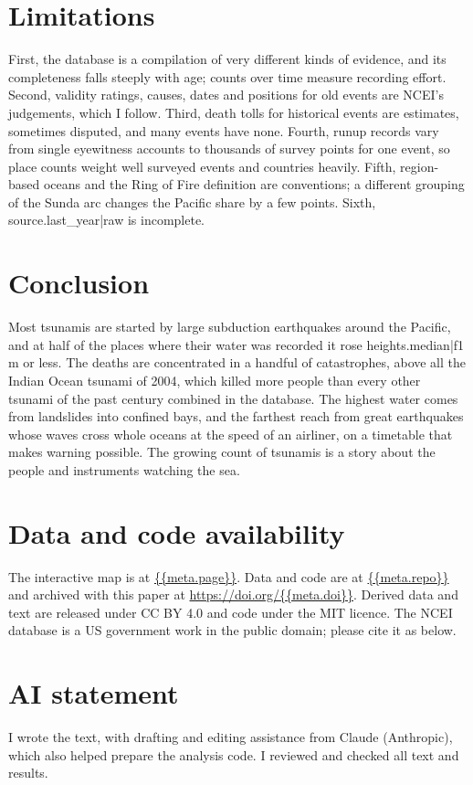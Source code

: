 \documentclass[11pt,a4paper]{article}
\begin{document}
\section{Limitations}
First, the database is a compilation of very different kinds of evidence, and its completeness falls steeply with age; counts over time measure recording effort. Second, validity ratings, causes, dates and positions for old events are NCEI's judgements, which I follow. Third, death tolls for historical events are estimates, sometimes disputed, and many events have none. Fourth, runup records vary from single eyewitness accounts to thousands of survey points for one event, so place counts weight well surveyed events and countries heavily. Fifth, region-based oceans and the Ring of Fire definition are conventions; a different grouping of the Sunda arc changes the Pacific share by a few points. Sixth, {{source.last_year|raw}} is incomplete.

\section{Conclusion}
Most tsunamis are started by large subduction earthquakes around the Pacific, and at half of the places where their water was recorded it rose {{heights.median|f1}} m or less. The deaths are concentrated in a handful of catastrophes, above all the Indian Ocean tsunami of 2004, which killed more people than every other tsunami of the past century combined in the database. The highest water comes from landslides into confined bays, and the farthest reach from great earthquakes whose waves cross whole oceans at the speed of an airliner, on a timetable that makes warning possible. The growing count of tsunamis is a story about the people and instruments watching the sea.

\section*{Data and code availability}
The interactive map is at \url{{{meta.page}}}. Data and code are at \url{{{meta.repo}}} and archived with this paper at \url{https://doi.org/{{meta.doi}}}. Derived data and text are released under CC BY 4.0 and code under the MIT licence. The NCEI database is a US government work in the public domain; please cite it as below.

\section*{AI statement}
I wrote the text, with drafting and editing assistance from Claude (Anthropic), which also helped prepare the analysis code. I reviewed and checked all text and results.
\end{document}
